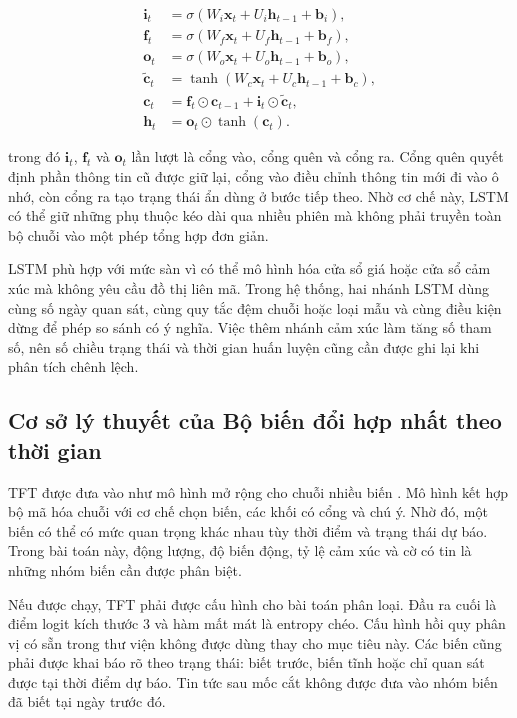 \begin{align}
  \mathbf{i}_t &= \sigma(W_i\mathbf{x}_t+U_i\mathbf{h}_{t-1}+\mathbf{b}_i),\\
  \mathbf{f}_t &= \sigma(W_f\mathbf{x}_t+U_f\mathbf{h}_{t-1}+\mathbf{b}_f),\\
  \mathbf{o}_t &= \sigma(W_o\mathbf{x}_t+U_o\mathbf{h}_{t-1}+\mathbf{b}_o),\\
  \widetilde{\mathbf{c}}_t &= \tanh(W_c\mathbf{x}_t+U_c\mathbf{h}_{t-1}+\mathbf{b}_c),\\
  \mathbf{c}_t &= \mathbf{f}_t\odot\mathbf{c}_{t-1}+
                 \mathbf{i}_t\odot\widetilde{\mathbf{c}}_t,\\
  \mathbf{h}_t &= \mathbf{o}_t\odot\tanh(\mathbf{c}_t).
  \label{eq:lstm-update}
\end{align}

trong đó $\mathbf{i}_t$, $\mathbf{f}_t$ và $\mathbf{o}_t$ lần lượt là cổng vào, cổng
quên và cổng ra. Cổng quên quyết định phần thông tin cũ được giữ lại, cổng vào điều
chỉnh thông tin mới đi vào ô nhớ, còn cổng ra tạo trạng thái ẩn dùng ở bước tiếp theo.
Nhờ cơ chế này, LSTM có thể giữ những phụ thuộc kéo dài qua nhiều phiên mà không phải
truyền toàn bộ chuỗi vào một phép tổng hợp đơn giản.

LSTM phù hợp với mức sàn vì có thể mô hình hóa cửa sổ giá hoặc cửa sổ cảm xúc mà không
yêu cầu đồ thị liên mã. Trong hệ thống, hai nhánh LSTM dùng cùng số ngày quan sát, cùng
quy tắc đệm chuỗi hoặc loại mẫu và cùng điều kiện dừng để phép so sánh có ý nghĩa. Việc
thêm nhánh cảm xúc làm tăng số tham số, nên số chiều trạng thái và thời gian huấn luyện
cũng cần được ghi lại khi phân tích chênh lệch.

\subsection{Cơ sở lý thuyết của Bộ biến đổi hợp nhất theo thời gian}

TFT được đưa vào như mô hình mở rộng cho chuỗi nhiều biến \cite{Lim2021_tft}. Mô hình
kết hợp bộ mã hóa chuỗi với cơ chế chọn biến, các khối có cổng và chú ý. Nhờ đó, một
biến có thể có mức quan trọng khác nhau tùy thời điểm và trạng thái dự báo. Trong bài
toán này, động lượng, độ biến động, tỷ lệ cảm xúc và cờ có tin là những nhóm biến cần
được phân biệt.

Nếu được chạy, TFT phải được cấu hình cho bài toán phân loại. Đầu ra cuối là điểm logit
kích thước 3 và hàm mất mát là entropy chéo. Cấu hình hồi quy phân vị có sẵn trong thư
viện không được dùng thay cho mục tiêu này. Các biến cũng phải được khai báo rõ theo
trạng thái: biết trước, biến tĩnh hoặc chỉ quan sát được tại thời điểm dự báo. Tin tức
sau mốc cắt không được đưa vào nhóm biến đã biết tại ngày trước đó.

